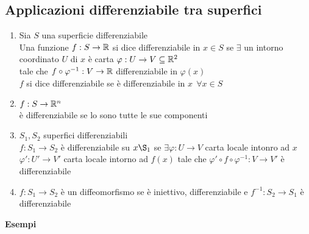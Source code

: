 \documentclass[12px]{article}
\begin{document}
	\subsection{Applicazioni differenziabile tra superfici}
	\begin{defi}
		\begin{enumerate}
			\item Sia $S$ una superficie differenziabile \\
				Una funzione  $f: S \rightarrow \mathbb{R}$ si dice differenziabile in $x\in S$ se  $\exists $ un intorno coordinato  $U$ di $x$ è carta  $ \varphi: U \rightarrow V\subseteq \mathbb{R}^2$\\
				tale che $f\circ \varphi^{-1}: V \rightarrow \mathbb{R}$ differenziabile in $ \varphi(x)$\\
				$f$ si dice differenziabile se è differenziabile in $x\ \ \forall x\in S$
			\item  $f: S \rightarrow \mathbb{R}^n$\\
				è differenziabile se lo sono tutte le sue componenti
			\item $S_1, S_2$ superfici differenziabili\\
				$f: S_1 \rightarrow S_2$ è differenziabile su $x\S_1$ se $\exists \varphi: U \rightarrow V$  carta locale intonro ad $x$\\
				$ \varphi': U' \rightarrow V'$ carta locale intorno ad $f(x)$ tale che  $ \varphi'\circ f\circ \varphi^{-1}: V \rightarrow V'$ è differenziabile
			\item $f: S_1 \rightarrow S_2$ è un diffeomorfismo se è iniettivo, differenziabile e $f^{-1}: S_2 \rightarrow S_1$ è differenziabile
		\end{enumerate}
	\end{defi}
	\textbf{Esempi}\\
\end{document}
